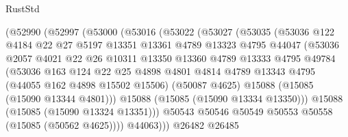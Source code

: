 \begin{lexlean}{RustStd}
\begin{coremodule}
                    (@52990
                      (@52997
                        (@53000
                          (@53016
                            (@53022
                              (@53027
                                (@53035
                                  (@53036
                                    @122
                                    @4184
                                    @22
                                    @27
                                    @5197
                                    @13351
                                    @13361
                                    @4789
                                    @13323
                                    @4795
                                    @44047
                                    (@53036
                                      @2057
                                      @4021
                                      @22
                                      @26
                                      @10311
                                      @13350
                                      @13360
                                      @4789
                                      @13333
                                      @4795
                                      @49784
                                      (@53036
                                        @163
                                        @124
                                        @22
                                        @25
                                        @4898
                                        @4801
                                        @4814
                                        @4789
                                        @13343
                                        @4795
                                        (@44055 @162 @4898 @15502 @15506)
                                        (@50087 @4625)
                                        @15088
                                        (@15085 (@15090 @13344 @4801)))
                                      @15088
                                      (@15085 (@15090 @13334 @13350)))
                                    @15088
                                    (@15085 (@15090 @13324 @13351)))
                                  @50543
                                  @50546
                                  @50549
                                  @50553
                                  @50558
                                  (@15085 (@50562 @4625))))
                              @44063)))
                        @26482
                        @26485

\end{coremodule}
\end{lexlean}
